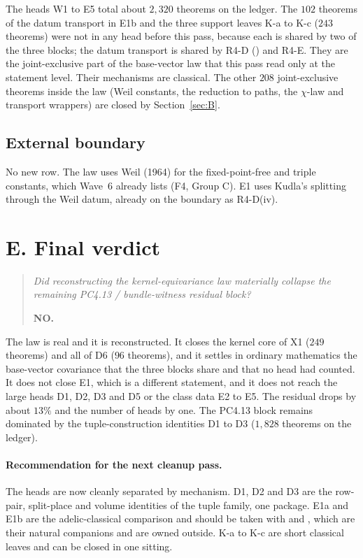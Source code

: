 \documentclass[11pt]{article}
\theoremstyle{definition}
\theoremstyle{remark}
\begin{document}
\noindent The heads W1 to E5 total about $2{,}320$ theorems on the ledger. The $102$ theorems of the datum transport in E1b and the three support leaves K-a to K-c ($243$ theorems) were not in any head before this pass, because each is shared by two of the three blocks; the datum transport is shared by R4-D () and R4-E. They are the joint-exclusive part of the base-vector law that this pass read only at the statement level. Their mechanisms are classical. The other $208$ joint-exclusive theorems inside the law (Weil constants, the reduction to paths, the $\chi$-law and transport wrappers) are closed by Section~\ref{sec:B}.

\subsection{External boundary}
No new row. The law uses Weil (1964) for the fixed-point-free and triple constants, which Wave~6 already lists (F4, Group C). E1 uses Kudla's splitting through the Weil datum, already on the boundary as R4-D(iv).

\section{E. Final verdict}

\begin{quote}
\emph{Did reconstructing the kernel-equivariance law materially collapse the remaining PC4.13 / bundle-witness residual block?}

\textbf{NO.}
\end{quote}

\noindent The law is real and it is reconstructed. It closes the kernel core of X1 ($249$ theorems) and all of D6 ($96$ theorems), and it settles in ordinary mathematics the base-vector covariance that the three blocks share and that no head had counted. It does not close E1, which is a different statement, and it does not reach the large heads D1, D2, D3 and D5 or the class data E2 to E5. The residual drops by about $13\%$ and the number of heads by one. The PC4.13 block remains dominated by the tuple-construction identities D1 to D3 ($1{,}828$ theorems on the ledger).

\paragraph{Recommendation for the next cleanup pass.} The heads are now cleanly separated by mechanism. D1, D2 and D3 are the row-pair, split-place and volume identities of the tuple family, one package. E1a and E1b are the adelic-classical comparison and should be taken with  and , which are their natural companions and are owned outside. K-a to K-c are short classical leaves and can be closed in one sitting.
\end{document}
